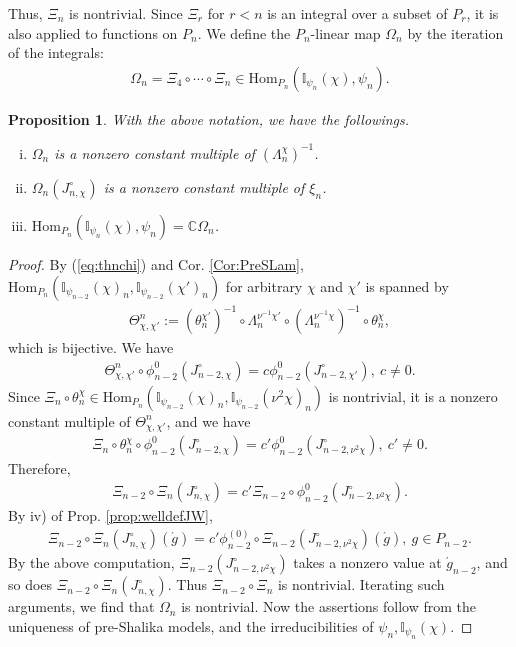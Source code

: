 \documentclass[11pt]{amsart}
\newcommand\C{{\mathbb{C}}}%
\newcommand\Ib{{\mathbb{I}}}
\newcommand\1{\mathbf{1}}
\newcommand\ac{\acute}
\newcommand\Hom{{\mathrm{Hom}}}%
\numberwithin{equation}{section}
\newtheorem{prop}[thm]{Proposition}
\begin{document}
Thus, $\Xi_{n}$ is nontrivial.
Since $\Xi_r$ for $r <n$ is an integral over a subset of $P_r$, it is also applied to functions on $P_n$.
We define the $P_n$-linear map $\Omega_n$ by the iteration of the integrals:
\begin{align*}
\Omega_{n} = \Xi_4 \circ \cdots \circ \Xi_{n} \in \Hom_{P_n}(\Ib_{\psi_n}(\chi),\psi_n).
\end{align*} 
\begin{prop}\label{prop:Ln}
With the above notation, we have the followings. 
\begin{enumerate}[i)]
\item $\Omega_n$ is a nonzero constant multiple of $(\Lambda_n^\chi)^{-1}$.
\item $\Omega_n(J_{n,\chi}^\circ)$ is  a nonzero constant multiple of $\xi_n$.
\item $\Hom_{P_n}(\Ib_{\psi_n}(\chi),\psi_n) = \C \Omega_n$.
\end{enumerate}
\end{prop}
\begin{proof}
By (\ref{eq:thnchi}) and Cor. \ref{Cor:PreSLam}, $\Hom_{P_{n}}(\Ib_{\psi_{n-2}}(\chi)_n, \Ib_{\psi_{n-2}}(\chi')_n)$ for arbitrary $\chi$ and $\chi'$ is spanned by 
\begin{align*}
\Theta_{\chi,\chi'}^n:= (\theta_n^{\chi'})^{-1} \circ \Lambda_n^{\nu^{-1}\chi'} \circ (\Lambda_n^{\nu^{-1}\chi})^{-1} \circ\theta_n^\chi,
 \end{align*}
which is bijective.
We have
\begin{align*}
\Theta_{\chi,\chi'}^n \circ \phi_{n-2}^{0} (J_{n-2,\chi}^\circ) = c \phi_{n-2}^{0}(J_{n-2,\chi'}^\circ), \ c \neq 0.
\end{align*}
Since $\Xi_n \circ \theta_n^{\chi} \in \Hom_{P_{n}}(\Ib_{\psi_{n-2}}(\chi)_n, \Ib_{\psi_{n-2}}(\nu^2\chi)_n)$ is nontrivial, it is a nonzero constant multiple of $\Theta_{\chi,\chi'}^n$, and we have
\begin{align*}
\Xi_n \circ \theta_n^{\chi} \circ \phi_{n-2}^{0} (J_{n-2,\chi}^\circ) = c' \phi_{n-2}^{0}(J_{n-2,\nu^2\chi}^\circ), \ c' \neq 0.
\end{align*} 
Therefore, 
\begin{align*}
\Xi_{n-2} \circ \Xi_n(J_{n,\chi}^\circ) = c' \Xi_{n-2} \circ  \phi_{n-2}^{0}(J_{n-2,\nu^2\chi}^\circ).
\end{align*} 
By iv) of Prop. \ref{prop:welldefJW}, 
\begin{align*}
\Xi_{n-2} \circ \Xi_n(J_{n,\chi}^\circ)(\ac{g}) = c' \phi_{n-2}^{(0)} \circ \Xi_{n-2} (J_{n-2,\nu^2\chi}^\circ)(\ac{g}), \ g \in P_{n-2}.
\end{align*} 
By the above computation, $\Xi_{n-2} (J_{n-2,\nu^2\chi}^\circ)$ takes a nonzero value at $\ac{g}_{n-2}$, and so does $\Xi_{n-2} \circ \Xi_{n}(J_{n,\chi}^\circ)$.
Thus $\Xi_{n-2} \circ \Xi_{n}$ is nontrivial.
Iterating such arguments, we find that $\Omega_n$ is nontrivial.
Now the assertions follow from the uniqueness of pre-Shalika models, and the irreducibilities of $\psi_n, \Ib_{\psi_n}(\chi)$.
\end{proof}
\end{document}
